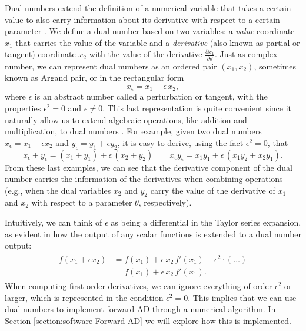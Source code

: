 Dual numbers extend the definition of a numerical variable that takes a certain value to also carry information about its derivative with respect to a certain parameter \cite{clifford1871dualnumbers}. 
We define a dual number based on two variables: a \textit{value} coordinate $x_1$ that carries the value of the variable and a \textit{derivative} (also known as partial or tangent) coordinate $x_2$ with the value of the derivative $\frac{\partial x_1}{\partial \theta}$. 
Just as complex number, we can represent dual numbers as an ordered pair $(x_1, x_2)$, sometimes known as Argand pair, or in the rectangular form 
\begin{equation}
 x_\epsilon = x_1 + \epsilon \, x_2,
\end{equation}
where $\epsilon$ is an abstract number called a perturbation or tangent, with the properties $\epsilon^2 = 0$ and $\epsilon \neq 0$.
This last representation is quite convenient since it naturally allow us to extend algebraic operations, like addition and multiplication, to dual numbers \cite{Karczmarczuk2001}. 
For example, given two dual numbers $x_\epsilon = x_1 + \epsilon x_2$ and $y_\epsilon = y_1 + \epsilon y_2$, it is easy to derive, using the fact $\epsilon^2=0$, that
\begin{equation}
 x_\epsilon + y_\epsilon = (x_1 + y_1) + \epsilon \, (x_2 + y_2)
 \qquad
 x_\epsilon y_\epsilon = x_1 y_1 + \epsilon \, (x_1 y_2 + x_2 y_1) .
\end{equation}
From these last examples, we can see that the derivative component of the dual number carries the information of the derivatives when combining operations (e.g., when the dual variables $x_2$ and $y_2$ carry the value of the derivative of $x_1$ and $x_2$ with respect to a parameter $\theta$, respectively). 

Intuitively, we can think of $\epsilon$ as being a differential in the Taylor series expansion, as evident in how the output of any scalar functions is extended to a dual number output:
\begin{align}
\begin{split}
    f(x_1 + \epsilon x_2)
    &= 
    f(x_1)
    + 
    \epsilon \, x_2 \,  f'(x_1)
    + 
    \epsilon^2 \cdot ( \ldots )\\
    &= 
    f(x_1)
    + 
    \epsilon \, x_2 \,  f'(x_1).
\end{split}
\label{eq:dual-number-function}
\end{align}
When computing first order derivatives, we can ignore everything of order $\epsilon^2$ or larger, which is represented in the condition $\epsilon^2 = 0$.
This implies that we can use dual numbers to implement forward AD through a numerical algorithm. 
In Section \ref{section:software-Forward-AD} we will explore how this is implemented. 

